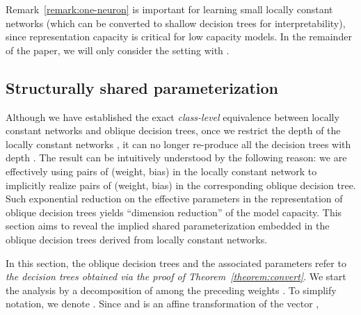 \documentclass{article} \usepackage{iclr2020_conference,times}
\begin{document}
\vspace{-1mm}
Remark~\ref{remark:one-neuron} is important for learning small locally constant networks (which can be converted to shallow decision trees for interpretability), since representation capacity is critical for low capacity models. In the remainder of the paper, we will only consider the setting with .
















































 \vspace{-1mm}
\subsection{Structurally shared parameterization}\label{sec:inductive-bias}

Although we have established the exact \emph{class-level} equivalence between locally constant networks and oblique decision trees, once we restrict the depth of the locally constant networks , it can no longer re-produce all the decision trees with depth . The result can be intuitively understood by the following reason: we are effectively using  pairs of (weight, bias) in the locally constant network to implicitly realize  pairs of (weight, bias) in the corresponding oblique decision tree. Such exponential reduction on the effective parameters in the representation of oblique decision trees yields ``dimension reduction'' of the model capacity. This section aims to reveal the implied shared parameterization embedded in the oblique decision trees derived from locally constant networks.

In this section, the oblique decision trees and the associated parameters refer to \emph{the decision trees obtained via the proof of Theorem~\ref{theorem:convert}}. We start the analysis by a decomposition of  among the preceding weights . To simplify notation, we denote .
Since  and  is an affine transformation of the vector , 
\end{document}
